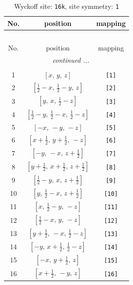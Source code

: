 \documentclass[fleqn,8pt]{jsarticle}
\begin{document}
\begin{longtable}{ccc}
\caption{Wyckoff site: {\tt 16k}, site symmetry: {\tt 1}}
 \\
 \hline \hline
No. & position & mapping \\ \hline \endfirsthead

\multicolumn{2}{l}{\tablename\ \thetable{}} \\
 \hline \hline
No. & position & mapping \\ \hline \endhead

 \hline \hline
\multicolumn{2}{r}{\footnotesize\it continued ...} \\ \endfoot

 \hline \hline
\multicolumn{2}{r}{} \\ \endlastfoot

1 & $\left[ x,\, y,\, z \right]$ & {\tt [1]} \\ \hline
2 & $\left[ \frac{1}{2} - x,\, \frac{1}{2} - y,\, z \right]$ & {\tt [2]} \\ \hline
3 & $\left[ y,\, x,\, \frac{1}{2} - z \right]$ & {\tt [3]} \\ \hline
4 & $\left[ \frac{1}{2} - y,\, \frac{1}{2} - x,\, \frac{1}{2} - z \right]$ & {\tt [4]} \\ \hline
5 & $\left[ - x,\, - y,\, - z \right]$ & {\tt [5]} \\ \hline
6 & $\left[ x + \frac{1}{2},\, y + \frac{1}{2},\, - z \right]$ & {\tt [6]} \\ \hline
7 & $\left[ - y,\, - x,\, z + \frac{1}{2} \right]$ & {\tt [7]} \\ \hline
8 & $\left[ y + \frac{1}{2},\, x + \frac{1}{2},\, z + \frac{1}{2} \right]$ & {\tt [8]} \\ \hline
9 & $\left[ \frac{1}{2} - y,\, x,\, z + \frac{1}{2} \right]$ & {\tt [9]} \\ \hline
10 & $\left[ y,\, \frac{1}{2} - x,\, z + \frac{1}{2} \right]$ & {\tt [10]} \\ \hline
11 & $\left[ x,\, \frac{1}{2} - y,\, - z \right]$ & {\tt [11]} \\ \hline
12 & $\left[ \frac{1}{2} - x,\, y,\, - z \right]$ & {\tt [12]} \\ \hline
13 & $\left[ y + \frac{1}{2},\, - x,\, \frac{1}{2} - z \right]$ & {\tt [13]} \\ \hline
14 & $\left[ - y,\, x + \frac{1}{2},\, \frac{1}{2} - z \right]$ & {\tt [14]} \\ \hline
15 & $\left[ - x,\, y + \frac{1}{2},\, z \right]$ & {\tt [15]} \\ \hline
16 & $\left[ x + \frac{1}{2},\, - y,\, z \right]$ & {\tt [16]} \\
\end{longtable}
\end{document}

